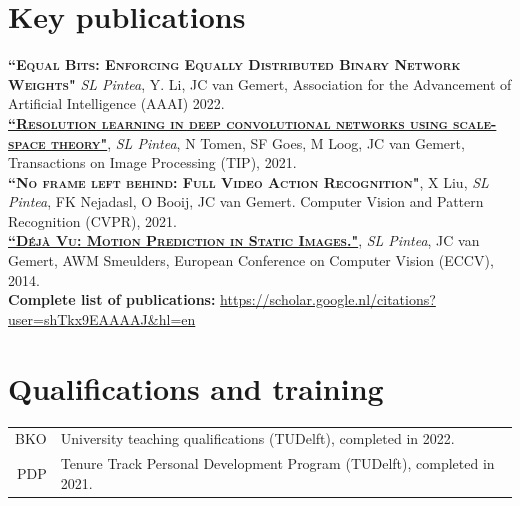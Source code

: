 \documentclass[a4paper, oneside, final]{scrartcl}
\begin{document}
\begin{center}
		\section{Key publications}
        \begin{flushleft}
            \textsc{\textbf{``Equal Bits: Enforcing Equally Distributed Binary Network Weights"}} \emph{SL Pintea}, Y. Li, JC van Gemert, Association for the Advancement of Artificial Intelligence (AAAI) 2022.\\[3px]

            \textsc{\textbf{\href{https://github.com/SilviaLauraPintea/N-JetNet}{``Resolution learning in deep convolutional networks using scale-space theory"}}}, \emph{SL Pintea}, N Tomen, SF Goes, M Loog, JC van Gemert, Transactions on Image Processing (TIP), 2021.\\[3px]
			\textsc{\textbf{``No frame left behind: Full Video Action Recognition"}}, X Liu, \emph{SL Pintea}, FK Nejadasl, O Booij, JC van Gemert. 
            Computer Vision and Pattern Recognition (CVPR), 2021.\\[3px]
            \textsc{\textbf{\href{http://github.com/SilviaLauraPintea/DejaVu}{``D\'{e}j\`{a} Vu: Motion Prediction in Static Images."}}}, \emph{SL Pintea}, JC van Gemert, AWM Smeulders, 
            European Conference on Computer Vision (ECCV), 2014.\\[10px]
            \textbf{Complete list of publications:} \href{https://scholar.google.nl/citations?user=shTkx9EAAAAJ&hl=en}{https://scholar.google.nl/citations?user=shTkx9EAAAAJ\&hl=en}\\
        \end{flushleft}
		\section{Qualifications and training}
		\begin{tabular}{r@{\hskip 0.3in}p{12.3cm}}
            \textsc{BKO}                   & University teaching qualifications (TUDelft), completed in 2022.\\
            \textsc{PDP}                   & Tenure Track Personal Development Program (TUDelft), completed in 2021.\\
		\end{tabular}

\end{center}
\end{document}
